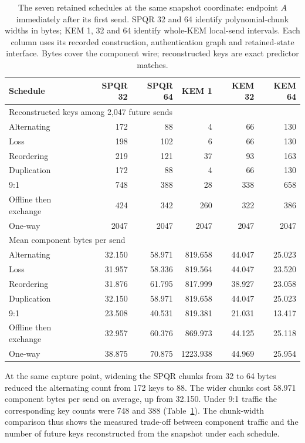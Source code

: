 \documentclass[pdflatex]{sn-jnl}
\theoremstyle{thmstyleone}
\theoremstyle{thmstylethree}
\theoremstyle{thmstyletwo}
\begin{document}
\begin{table}[t]
\centering
\small
\setlength{\tabcolsep}{4pt}
\begin{tabular}{@{}lrrrrr@{}}
\toprule
Schedule & SPQR 32 & SPQR 64 & KEM 1 & KEM 32 & KEM 64\\
\midrule
\multicolumn{6}{l}{Reconstructed keys among 2,047 future sends}\\
Alternating & 172 & 88 & 4 & 66 & 130\\
Loss & 198 & 102 & 6 & 66 & 130\\
Reordering & 219 & 121 & 37 & 93 & 163\\
Duplication & 172 & 88 & 4 & 66 & 130\\
9:1 & 748 & 388 & 28 & 338 & 658\\
Offline then exchange & 424 & 342 & 260 & 322 & 386\\
One-way & 2047 & 2047 & 2047 & 2047 & 2047\\
\midrule
\multicolumn{6}{l}{Mean component bytes per send}\\
Alternating & 32.150 & 58.971 & 819.658 & 44.047 & 25.023\\
Loss & 31.957 & 58.336 & 819.564 & 44.047 & 23.520\\
Reordering & 31.876 & 61.795 & 817.999 & 38.927 & 23.058\\
Duplication & 32.150 & 58.971 & 819.658 & 44.047 & 25.023\\
9:1 & 23.508 & 40.531 & 819.381 & 21.031 & 13.417\\
Offline then exchange & 32.957 & 60.376 & 869.973 & 44.125 & 25.118\\
One-way & 38.875 & 70.875 & 1223.938 & 44.969 & 25.954\\
\bottomrule
\end{tabular}
\caption{The seven retained schedules at the same snapshot coordinate: endpoint $A$ immediately after its first send. SPQR 32 and 64 identify polynomial-chunk widths in bytes; KEM 1, 32 and 64 identify whole-KEM local-send intervals. Each column uses its recorded construction, authentication graph and retained-state interface. Bytes cover the component wire; reconstructed keys are exact predictor matches.}
\label{tab:reference-schedules}
\end{table}

At the same capture point, widening the SPQR chunks from 32 to 64 bytes
reduced the alternating count from 172 keys to 88. The wider chunks cost
58.971 component bytes per send on average, up from 32.150. Under 9:1
traffic the corresponding key counts were 748 and 388
(Table~\ref{tab:reference-schedules}). The chunk-width comparison thus
shows the measured trade-off between component traffic and the number of
future keys reconstructed from the snapshot under each schedule.
\end{document}
